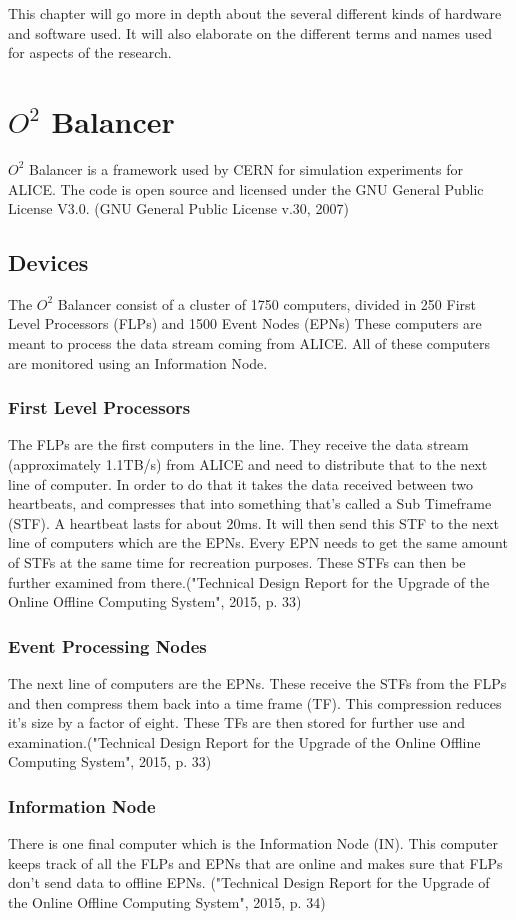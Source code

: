 This chapter will go more in depth about the several different kinds of hardware and software used. It will also elaborate on the different terms and names used for aspects of the research.
\section{$O^2$ Balancer}
$O^2$ Balancer is a framework used by CERN for simulation experiments for ALICE. The code is open source and licensed under the GNU General Public License V3.0. (GNU General Public License v.30, 2007)

\subsection{Devices}
The $O^2$ Balancer consist of a cluster of 1750 computers, divided in 250 First Level Processors (FLPs) and 1500 Event  Nodes (EPNs) These computers are meant to process the data stream coming from ALICE. All of these computers are monitored using an Information Node.

\subsubsection*{First Level Processors}
The FLPs are the first computers in the line. They receive the data stream (approximately 1.1TB/s) from ALICE and need to distribute that to the next line of computer. In order to do that it takes the data received between two heartbeats, and compresses that into something that's called a Sub Timeframe (STF). A heartbeat lasts for about 20ms. It will then send this STF to the next line of computers which are the EPNs. Every EPN needs to get the same amount of STFs at the same time for recreation purposes. These STFs can then be further examined from there.("Technical Design Report for the Upgrade of the Online Offline Computing System", 2015, p. 33)

\subsubsection*{Event Processing Nodes}
The next line of computers are the EPNs. These receive the STFs from the FLPs and then compress them back into a time frame (TF). This compression reduces it's size by a factor of eight. These TFs are then stored for further use and examination.("Technical Design Report for the Upgrade of the Online Offline Computing System", 2015, p. 33)

\subsubsection*{Information Node}
There is one final computer which is the Information Node (IN). This computer keeps track of all the FLPs and EPNs that are online and makes sure that FLPs don't send data to offline EPNs. ("Technical Design Report for the Upgrade of the Online Offline Computing System", 2015, p. 34)

